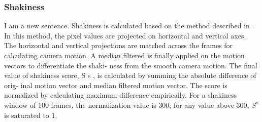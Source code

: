 \documentclass{sig-alternate}
\begin{document}
\subsubsection{Shakiness}
I am a new sentence.
Shakiness is calculated based on the method described in \cite{salas:four}.
In this method, the pixel values are projected on horizontal and
vertical axes. The horizontal and vertical projections are matched
across the frames for calculating camera motion. A median filtered
is finally applied on the motion vectors to differentiate the shaki-
ness from the smooth camera motion. The final value of shakiness
score, S s , is calculated by summing the absolute difference of orig-
inal motion vector and median filtered motion vector. The score is
normalized by calculating maximum difference empirically. For a
shakiness window of 100 frames, the normalization value is 300;
for any value above 300, $S^s$ is saturated to 1.
\end{document}

